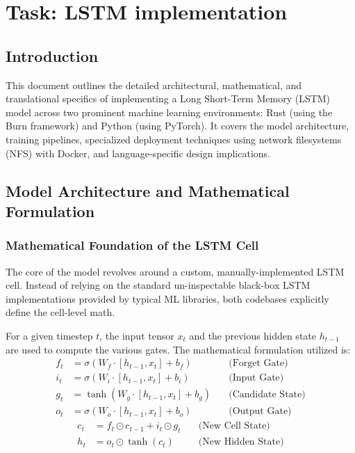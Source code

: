 \documentclass{ieeeaccess}
\begin{document}
\section{Task: LSTM implementation}

\subsection{Introduction}
This document outlines the detailed architectural, mathematical, and translational specifics of implementing a Long Short-Term Memory (LSTM) model across two prominent machine learning environments: Rust (using the Burn framework) and Python (using PyTorch). It covers the model architecture, training pipelines, specialized deployment techniques using network filesystems (NFS) with Docker, and language-specific design implications.

\subsection{Model Architecture and Mathematical Formulation}

\subsubsection{Mathematical Foundation of the LSTM Cell}
The core of the model revolves around a custom, manually-implemented LSTM cell. Instead of relying on the standard un-inspectable black-box LSTM implementations provided by typical ML libraries, both codebases explicitly define the cell-level math. 

For a given timestep $t$, the input tensor $x_t$ and the previous hidden state $h_{t-1}$ are used to compute the various gates. The mathematical formulation utilized is:
\begin{align}
    f_t &= \sigma(W_f \cdot [h_{t-1}, x_t] + b_f) \quad &\text{(Forget Gate)} \\
    i_t &= \sigma(W_i \cdot [h_{t-1}, x_t] + b_i) \quad &\text{(Input Gate)} \\
    g_t &= \tanh(W_g \cdot [h_{t-1}, x_t] + b_g) \quad &\text{(Candidate State)} \\
    o_t &= \sigma(W_o \cdot [h_{t-1}, x_t] + b_o) \quad &\text{(Output Gate)}
\end{align}
\begin{align}
    c_t &= f_t \odot c_{t-1} + i_t \odot g_t \quad &\text{(New Cell State)} \\
    h_t &= o_t \odot \tanh(c_t) \quad &\text{(New Hidden State)}
\end{align}
\end{document}
